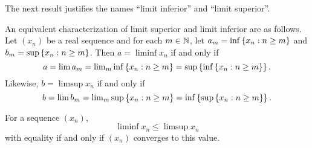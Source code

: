 \documentclass{book}
\begin{document}
The next result justifies the names ``limit inferior'' and ``limit superior''.
\begin{prop}
An equivalent characterization of limit superior and limit inferior are as follows. Let $(x_n)$ be a real sequence
and for each $m \in \mathbb{N}$, let $a_m = \inf \left\{ x_n : n \geq m \right\}$ and $b_m = \sup \left\{ x_n : n \geq m \right\}$. Then
$a = \liminf x_n$ if and only if
\[
	a = \lim a_m = \textstyle \lim_m \inf \left\{ x_n : n \geq m \right\} = \sup \left\{ \inf \left\{ x_n : n \geq m \right\} \right\}.
\]
Likewise, $b = \limsup x_n$ if and only if
\[
	b = \lim b_m = \textstyle \lim_m \sup \left\{ x_n : n \geq m \right\} = \inf \left\{ \sup \left\{ x_n : n \geq m \right\} \right\}.
\]
\label{P:limsup_alt}
\end{prop}


\begin{prop}
For a sequence $(x_n)$,
\[
	\liminf x_n \leq \limsup x_n
\]
with equality if and only if $(x_n)$ converges to this value.
\label{P:limsup_ineq}
\end{prop}
\end{document}
